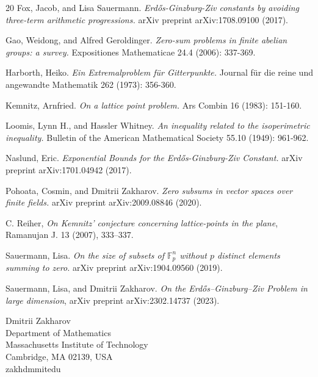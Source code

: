 \documentclass{daj}
\theoremstyle{definition}
\theoremstyle{remark}
\theoremstyle{definition}
\theoremstyle{definition}
\begin{document}
\begin{thebibliography}{20}
 Fox, Jacob, and Lisa Sauermann. {\it Erd\H{o}s-Ginzburg-Ziv constants by avoiding three-term arithmetic progressions.} arXiv preprint arXiv:1708.09100 (2017).

 Gao, Weidong, and Alfred Geroldinger. {\it Zero-sum problems in finite abelian groups: a survey.} Expositiones Mathematicae 24.4 (2006): 337-369.

 Harborth, Heiko. {\it Ein Extremalproblem f{\" u}r Gitterpunkte.} Journal f{\" u}r die reine und angewandte Mathematik 262 (1973): 356-360.

 Kemnitz, Arnfried. {\it On a lattice point problem.} Ars Combin 16 (1983): 151-160.

 Loomis, Lynn H., and Hassler Whitney. {\it An inequality related to the isoperimetric inequality.} Bulletin of the American Mathematical Society 55.10 (1949): 961-962.

 Naslund, Eric. {\it Exponential Bounds for the Erd{\H o}s-Ginzburg-Ziv Constant.} arXiv preprint arXiv:1701.04942 (2017).

 Pohoata, Cosmin, and Dmitrii Zakharov. {\it Zero subsums in vector spaces over finite fields.} arXiv preprint arXiv:2009.08846 (2020).

 C. Reiher, {\it On Kemnitz' conjecture concerning lattice-points in the plane}, Ramanujan J. 13
(2007), 333--337.

 Sauermann, Lisa. {\it On the size of subsets of $\mathbb {F} _p^{n} $ without $ p $ distinct elements summing to zero.} arXiv preprint arXiv:1904.09560 (2019).

 Sauermann, Lisa, and Dmitrii Zakharov. {\it On the Erd\H{o}s--Ginzburg--Ziv Problem in large dimension}, arXiv preprint arXiv:2302.14737 (2023).

\end{thebibliography}

\begin{dajauthors}
\begin{authorinfo}[dz]
  Dmitrii Zakharov\\
  Department of Mathematics\\
  Massachusetts Institute of Technology\\
  Cambridge, MA 02139, USA\\
  zakhdm\imageat{}mit\imagedot{}edu
\end{authorinfo}
\end{dajauthors}
\end{document}
